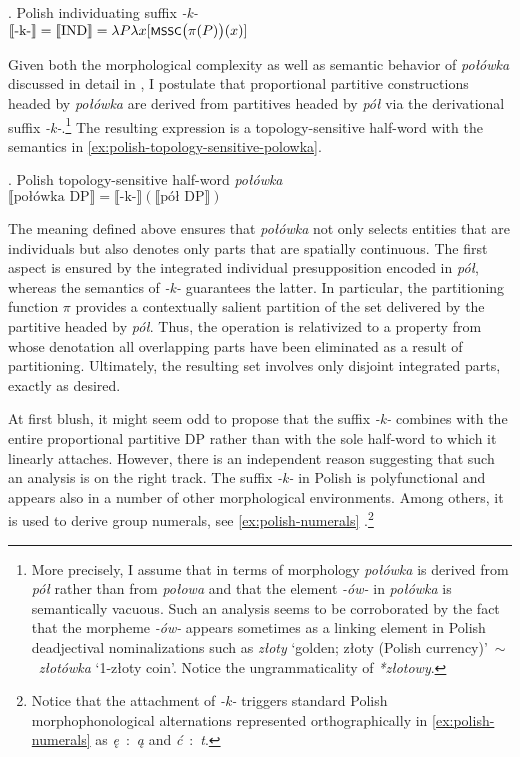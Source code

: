 	\ex. Polish individuating suffix \textit{-k-}\\
	$\llbracket \text{-k-}\rrbracket = \llbracket \text{IND}\rrbracket = \lambda P \lambda x[\cnst{mssc}\big(\pi(P)\big)(x)]$\label{ex:polish-individuating-suffix}
	
	Given both the morphological complexity as well as semantic behavior of \textit{połówka} discussed in detail in  , I postulate that proportional partitive constructions headed by \textit{połówka} are derived from partitives headed by \textit{pół} via the derivational suffix \textit{-k-}.\footnote{More precisely, I assume that in terms of morphology \textit{połówka} is derived from \textit{pół} rather than from \textit{połowa} and that the element \textit{-ów-} in \textit{połówka} is semantically vacuous. Such an analysis seems to be corroborated by the fact that the morpheme \textit{-ów-} appears sometimes as a linking element in Polish deadjectival nominalizations such as \textit{złoty} `golden; złoty (Polish currency)'~$\sim$~\textit{złotówka} `1-złoty coin'. Notice the ungrammaticality of \textit{*złotowy}.} The resulting expression is a topology-sensitive half-word with the semantics in \ref{ex:polish-topology-sensitive-polowka}.
	
	\ex. Polish topology-sensitive half-word \textit{połówka}\\
	$\llbracket \text{połówka DP}\rrbracket = \llbracket \text{-k-}\rrbracket(\llbracket \text{pół DP}\rrbracket)$\label{ex:polish-topology-sensitive-polowka}
	
	The meaning defined above ensures that \textit{połówka} not only selects entities that are  individuals but also denotes only parts that are spatially continuous. The first aspect is ensured by the integrated individual presupposition encoded in \textit{pół}, whereas the semantics of \textit{-k-} guarantees the latter. In particular, the partitioning function $\pi$ provides a contextually salient partition of the set delivered by the partitive headed by \textit{pół}. Thus, the  operation is relativized to a property from whose denotation all overlapping parts have been eliminated as a result of partitioning. Ultimately, the resulting set involves only disjoint integrated parts, exactly as desired.
	
	At first blush, it might seem odd to propose that the suffix \textit{-k-} combines with the entire proportional partitive DP rather than with the sole half-word to which it linearly attaches. However, there is an independent reason suggesting that such an analysis is on the right track. The suffix \textit{-k-} in Polish is polyfunctional and appears also in a number of other morphological environments. Among others, it is used to derive group numerals, see \ref{ex:polish-numerals} \citep[see][]{wagiel2015sums}.\footnote{Notice that the attachment of \textit{-k-} triggers standard Polish morphophonological alternations represented orthographically in \ref{ex:polish-numerals} as \textit{ę}~:~\textit{ą} and \textit{ć}~:~\textit{t}.} 
	

